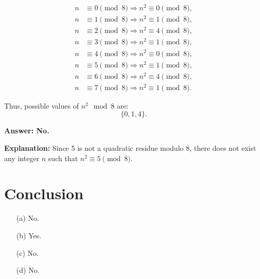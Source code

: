 \documentclass[12pt]{article}
\begin{document}
\[
\begin{aligned}
n &\equiv 0 \pmod{8} \Rightarrow n^2 \equiv 0 \pmod{8}, \\
n &\equiv 1 \pmod{8} \Rightarrow n^2 \equiv 1 \pmod{8}, \\
n &\equiv 2 \pmod{8} \Rightarrow n^2 \equiv 4 \pmod{8}, \\
n &\equiv 3 \pmod{8} \Rightarrow n^2 \equiv 1 \pmod{8}, \\
n &\equiv 4 \pmod{8} \Rightarrow n^2 \equiv 0 \pmod{8}, \\
n &\equiv 5 \pmod{8} \Rightarrow n^2 \equiv 1 \pmod{8}, \\
n &\equiv 6 \pmod{8} \Rightarrow n^2 \equiv 4 \pmod{8}, \\
n &\equiv 7 \pmod{8} \Rightarrow n^2 \equiv 1 \pmod{8}.
\end{aligned}
\]

Thus, possible values of \( n^2 \mod 8 \) are:
\[
\{0, 1, 4\}.
\]

\textbf{Answer: No.}

\textbf{Explanation:} Since 5 is not a quadratic residue modulo 8, there does not exist any integer \( n \) such that \( n^2 \equiv 5 \pmod{8} \).

\section{Conclusion}

\begin{itemize}
    \item[(a)] No.
    \item[(b)] Yes.
    \item[(c)] No.
    \item[(d)] No.
\end{itemize}
\end{document}
